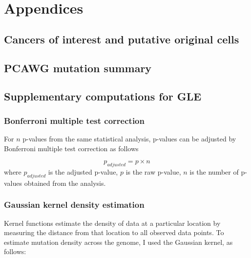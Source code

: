 \newpage
\setcounter{table}{0}
\setcounter{figure}{0}
\setcounter{section}{0}
\setcounter{equation}{0}
\renewcommand\thesection{A.\arabic{section}} 
\renewcommand\thefigure{A\arabic{figure}} 
\renewcommand\thetable{A\arabic{table}} 
\renewcommand\theequation{A\arabic{table}} 

\chapter*{Appendices}

\section{Cancers of interest and putative original cells}


\section{PCAWG mutation summary}
\vspace{1cm}

\vspace{2cm}


% 

\newpage
\section{Supplementary computations for GLE}
\subsection{Bonferroni multiple test correction}
For $n$ p-values from the same statistical analysis, p-values can be adjusted by Bonferroni multiple test correction as follows

\begin{equation}
    p_{adjusted} = p \times n
    \label{eq:bonferroni}
\end{equation}
where $p_{adjusted}$ is the adjusted p-value, $p$ is the raw p-value, $n$ is the number of p-values obtained from the analysis.

\subsection{Gaussian kernel density estimation}
Kernel functions estimate the density of data at a particular location by measuring the distance from that location to all observed data points. To estimate mutation density across the genome, I used the Gaussian kernel, as follows:

